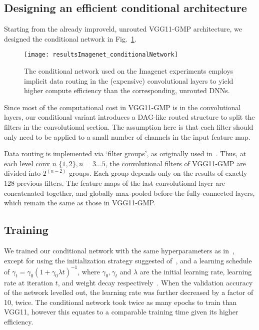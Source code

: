 \documentclass[thesis]{subfiles}
\begin{document}
	\subsection{Designing an efficient conditional architecture}
	Starting from the already improveld, unrouted VGG11-GMP architecture, we designed the conditional network in Fig.~\ref{fig:Imagenet_CondNet}.
	\begin{figure}[tbp]
		\centering
		\texttt{[image: resultsImagenet\_conditionalNetwork]}
		\caption[Conditional network used with Imagenet ILSVRC experiments]{The conditional network used on the Imagenet experiments employs implicit data routing in the (expensive) convolutional layers to yield higher compute efficiency than the corresponding, unrouted DNNs.}
		\label{fig:Imagenet_CondNet}
	\end{figure}
	Since most of the computational cost in VGG11-GMP is in the convolutional layers, our conditional variant 
	introduces a DAG-like routed structure to split the filters in the convolutional section.
	The assumption here is that each filter should only need to be applied to a small number of channels in the input feature map.
	
	Data routing is implemented via `filter groups', as originally used in~\citep{Krizhevsky2012imanet}. 
	Thus, at each level $\textrm{conv}\_n\_\{1,2\}, n=3\ldots 5$, the convolutional filters of VGG11-GMP are 
	divided into $2^{(n-2)}$ groups. Each group depends only on the results of exactly 128 previous filters. 
	The feature maps of the last convolutional layer are concatenated together, and globally max-pooled
	before the fully-connected layers, which remain the same as those in VGG11-GMP.
	
	\subsection{Training}
	We trained our conditional network with the same hyperparameters as in~\citep{Simonyan2014verydeep}, 
	except for using the initialization strategy suggested of~\citep{He2015b}, and a learning schedule of 
	$\gamma_t = \gamma_0(1+\gamma_0\lambda t)^{-1}$, where $\gamma_0,\gamma_t$ and $\lambda$ 
	are the initial learning rate, learning rate at iteration $t$, and weight decay respectively~\citep{Bottou2012sgdtricks}. 
	When the validation accuracy of the network levelled out, the learning rate was further decreased by a factor of 10, twice. 
	The conditional network took twice as many epochs to train than VGG11, however this equates to a comparable
	training time given its higher efficiency.
	
\end{document}
